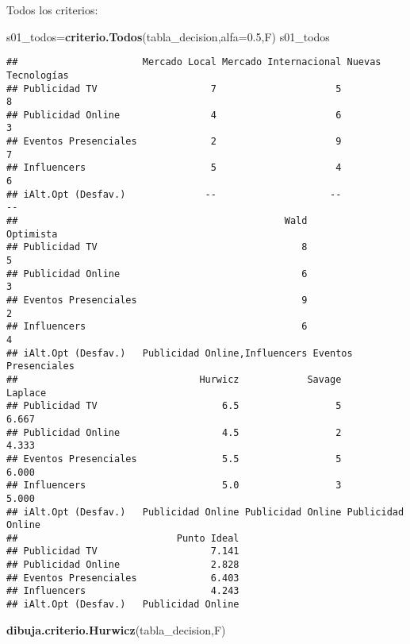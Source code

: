 \documentclass[
]{article}
\newenvironment{Shaded}{\begin{snugshade}}{\end{snugshade}}
\newcommand{\AttributeTok}[1]{\textcolor[rgb]{0.13,0.29,0.53}{#1}}
\newcommand{\FloatTok}[1]{\textcolor[rgb]{0.00,0.00,0.81}{#1}}
\newcommand{\FunctionTok}[1]{\textcolor[rgb]{0.13,0.29,0.53}{\textbf{#1}}}
\newcommand{\NormalTok}[1]{#1}
\newcommand{\OtherTok}[1]{\textcolor[rgb]{0.56,0.35,0.01}{#1}}
\begin{document}
Todos los criterios:

\begin{Shaded}
\begin{Highlighting}[]
\NormalTok{s01\_todos}\OtherTok{=}\FunctionTok{criterio.Todos}\NormalTok{(tabla\_decision,}\AttributeTok{alfa=}\FloatTok{0.5}\NormalTok{,F)}
\NormalTok{s01\_todos}
\end{Highlighting}
\end{Shaded}

\begin{verbatim}
##                      Mercado Local Mercado Internacional Nuevas Tecnologías
## Publicidad TV                    7                     5                  8
## Publicidad Online                4                     6                  3
## Eventos Presenciales             2                     9                  7
## Influencers                      5                     4                  6
## iAlt.Opt (Desfav.)              --                    --                 --
##                                               Wald            Optimista
## Publicidad TV                                    8                    5
## Publicidad Online                                6                    3
## Eventos Presenciales                             9                    2
## Influencers                                      6                    4
## iAlt.Opt (Desfav.)   Publicidad Online,Influencers Eventos Presenciales
##                                Hurwicz            Savage           Laplace
## Publicidad TV                      6.5                 5             6.667
## Publicidad Online                  4.5                 2             4.333
## Eventos Presenciales               5.5                 5             6.000
## Influencers                        5.0                 3             5.000
## iAlt.Opt (Desfav.)   Publicidad Online Publicidad Online Publicidad Online
##                            Punto Ideal
## Publicidad TV                    7.141
## Publicidad Online                2.828
## Eventos Presenciales             6.403
## Influencers                      4.243
## iAlt.Opt (Desfav.)   Publicidad Online
\end{verbatim}

\begin{Shaded}
\begin{Highlighting}[]
\FunctionTok{dibuja.criterio.Hurwicz}\NormalTok{(tabla\_decision,F)}
\end{Highlighting}
\end{Shaded}
\end{document}
